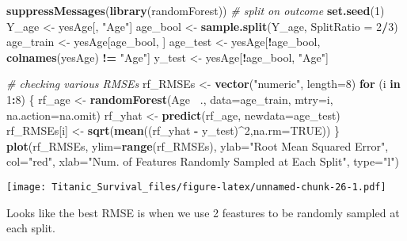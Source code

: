 \documentclass[]{article}
\newenvironment{Shaded}{\begin{snugshade}}{\end{snugshade}}
\newcommand{\KeywordTok}[1]{\textcolor[rgb]{0.13,0.29,0.53}{\textbf{#1}}}
\newcommand{\DataTypeTok}[1]{\textcolor[rgb]{0.13,0.29,0.53}{#1}}
\newcommand{\DecValTok}[1]{\textcolor[rgb]{0.00,0.00,0.81}{#1}}
\newcommand{\StringTok}[1]{\textcolor[rgb]{0.31,0.60,0.02}{#1}}
\newcommand{\CommentTok}[1]{\textcolor[rgb]{0.56,0.35,0.01}{\textit{#1}}}
\newcommand{\OtherTok}[1]{\textcolor[rgb]{0.56,0.35,0.01}{#1}}
\newcommand{\ControlFlowTok}[1]{\textcolor[rgb]{0.13,0.29,0.53}{\textbf{#1}}}
\newcommand{\OperatorTok}[1]{\textcolor[rgb]{0.81,0.36,0.00}{\textbf{#1}}}
\newcommand{\NormalTok}[1]{#1}
\begin{document}
\begin{Shaded}
\begin{Highlighting}[]
\KeywordTok{suppressMessages}\NormalTok{(}\KeywordTok{library}\NormalTok{(randomForest))}
\CommentTok{# split on outcome}
\KeywordTok{set.seed}\NormalTok{(}\DecValTok{1}\NormalTok{)}
\NormalTok{Y_age <-}\StringTok{ }\NormalTok{yesAge[, }\StringTok{"Age"}\NormalTok{]}
\NormalTok{age_bool <-}\StringTok{ }\KeywordTok{sample.split}\NormalTok{(Y_age, }\DataTypeTok{SplitRatio =} \DecValTok{2}\OperatorTok{/}\DecValTok{3}\NormalTok{) }
\NormalTok{age_train <-}\StringTok{ }\NormalTok{yesAge[age_bool, ]}
\NormalTok{age_test <-}\StringTok{ }\NormalTok{yesAge[}\OperatorTok{!}\NormalTok{age_bool, }\KeywordTok{colnames}\NormalTok{(yesAge) }\OperatorTok{!=}\StringTok{ "Age"}\NormalTok{]}
\NormalTok{y_test <-}\StringTok{ }\NormalTok{yesAge[}\OperatorTok{!}\NormalTok{age_bool, }\StringTok{"Age"}\NormalTok{]}

\CommentTok{# checking various RMSEs}
\NormalTok{rf_RMSEs <-}\StringTok{ }\KeywordTok{vector}\NormalTok{(}\StringTok{"numeric"}\NormalTok{, }\DataTypeTok{length=}\DecValTok{8}\NormalTok{)}
\ControlFlowTok{for}\NormalTok{ (i }\ControlFlowTok{in} \DecValTok{1}\OperatorTok{:}\DecValTok{8}\NormalTok{) \{}
\NormalTok{  rf_age <-}\StringTok{ }\KeywordTok{randomForest}\NormalTok{(Age }\OperatorTok{~}\NormalTok{., }\DataTypeTok{data=}\NormalTok{age_train, }\DataTypeTok{mtry=}\NormalTok{i, }\DataTypeTok{na.action=}\NormalTok{na.omit)}
\NormalTok{  rf_yhat <-}\StringTok{ }\KeywordTok{predict}\NormalTok{(rf_age, }\DataTypeTok{newdata=}\NormalTok{age_test)}
\NormalTok{  rf_RMSEs[i] <-}\StringTok{ }\KeywordTok{sqrt}\NormalTok{(}\KeywordTok{mean}\NormalTok{((rf_yhat }\OperatorTok{-}\StringTok{ }\NormalTok{y_test)}\OperatorTok{^}\DecValTok{2}\NormalTok{,}\DataTypeTok{na.rm=}\OtherTok{TRUE}\NormalTok{))}
\NormalTok{\}}
\KeywordTok{plot}\NormalTok{(rf_RMSEs, }\DataTypeTok{ylim=}\KeywordTok{range}\NormalTok{(rf_RMSEs), }\DataTypeTok{ylab=}\StringTok{"Root Mean Squared Error"}\NormalTok{, }\DataTypeTok{col=}\StringTok{"red"}\NormalTok{,}
     \DataTypeTok{xlab=}\StringTok{"Num. of Features Randomly Sampled at Each Split"}\NormalTok{, }\DataTypeTok{type=}\StringTok{"l"}\NormalTok{)}
\end{Highlighting}
\end{Shaded}

\texttt{[image: Titanic\_Survival\_files/figure-latex/unnamed-chunk-26-1.pdf]}

Looks like the best RMSE is when we use 2 feastures to be randomly
sampled at each split.
\end{document}
